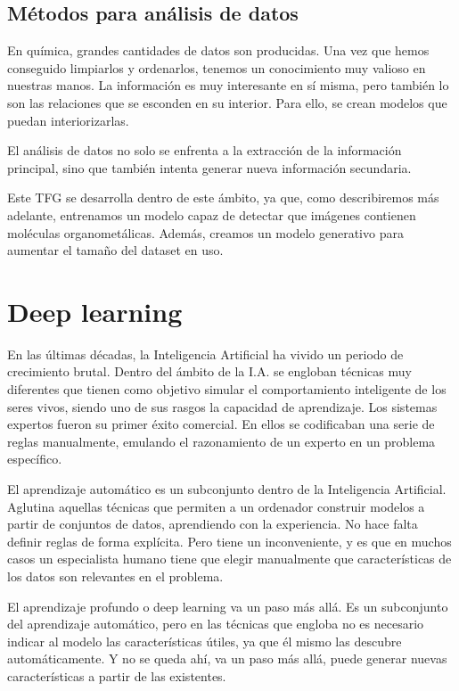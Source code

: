 \subsection*{Métodos para análisis de datos}
En química, grandes cantidades de datos son producidas. Una vez que hemos conseguido limpiarlos y ordenarlos, tenemos un conocimiento muy valioso en nuestras manos. La información es muy interesante en sí misma, pero también lo son las relaciones que se esconden en su interior. Para ello, se crean modelos que puedan interiorizarlas.

El análisis de datos no solo se enfrenta a la extracción de la información principal, sino que también intenta generar nueva información secundaria. \cite{doi:10.1021/ci600234z}

Este TFG se desarrolla dentro de este ámbito, ya que, como describiremos más adelante, entrenamos un modelo capaz de detectar que imágenes contienen moléculas organometálicas. Además, creamos un modelo generativo para aumentar el tamaño del dataset en uso.

\newpage
\section*{Deep learning}
En las últimas décadas, la Inteligencia Artificial ha vivido un periodo de crecimiento brutal. Dentro del ámbito de la I.A. se engloban técnicas muy diferentes que tienen como objetivo simular el comportamiento inteligente de los seres vivos, siendo uno de sus rasgos la capacidad de aprendizaje. Los sistemas expertos fueron su primer éxito comercial. En ellos se codificaban una serie de reglas manualmente, emulando el razonamiento de un experto en un problema específico.

El aprendizaje automático es un subconjunto dentro de la Inteligencia Artificial. Aglutina aquellas técnicas que permiten a un ordenador construir modelos a partir de conjuntos de datos, aprendiendo con la experiencia. No hace falta definir reglas de forma explícita. Pero tiene un inconveniente, y es que en muchos casos un especialista humano tiene que elegir manualmente que características de los datos son relevantes en el problema.

El aprendizaje profundo o deep learning va un paso más allá. Es un subconjunto del aprendizaje automático, pero en las técnicas que engloba no es necesario indicar al modelo  las características útiles, ya que él mismo las descubre automáticamente. Y no se queda ahí, va un paso más allá, puede generar nuevas características a partir de las existentes.

